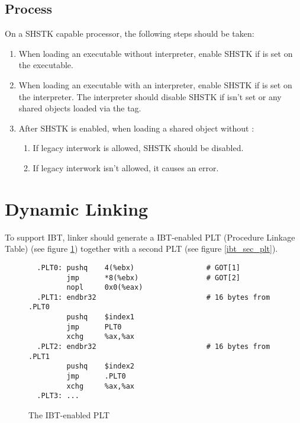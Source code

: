 \subsection{Process }
\label{shstk}

On a SHSTK capable processor, the following steps should be taken:

\begin{enumerate}
  \item
    \begin{sloppypar}
      When loading an executable without interpreter, enable SHSTK if
       is set on the executable.
    \end{sloppypar}
  \item
    \begin{sloppypar}
      When loading an executable with an interpreter, enable SHSTK if
       is set on the interpreter.
      The interpreter should disable SHSTK if
       isn't set or any shared
      objects loaded via the  tag.
    \end{sloppypar}
  \item
    \begin{sloppypar}
      After SHSTK is enabled, when loading a shared object without
      :
    \end{sloppypar}
    \begin{enumerate}
      \item If legacy interwork is allowed, SHSTK should be disabled.
      \item If legacy interwork isn't allowed, it causes an error.
    \end{enumerate}
\end{enumerate}

\section{Dynamic Linking}

To support IBT, linker should generate a IBT-enabled PLT (Procedure
Linkage Table) (see figure \ref{ibt_plt}) together with a second
PLT (see figure \ref{ibt_sec_plt}).

\begin{figure}[H]
\Hrule
\caption{The IBT-enabled PLT}
\label{ibt_plt}
\begin{footnotesize}
\begin{verbatim}
  .PLT0: pushq    4(%ebx)                 # GOT[1]
         jmp      *8(%ebx)                # GOT[2]
         nopl     0x0(%eax)
  .PLT1: endbr32                          # 16 bytes from .PLT0
         pushq    $index1
         jmp      PLT0
         xchg     %ax,%ax
  .PLT2: endbr32                          # 16 bytes from .PLT1
         pushq    $index2
         jmp      .PLT0
         xchg     %ax,%ax
  .PLT3: ...
\end{verbatim}%
\end{footnotesize}
\Hrule
\end{figure}

